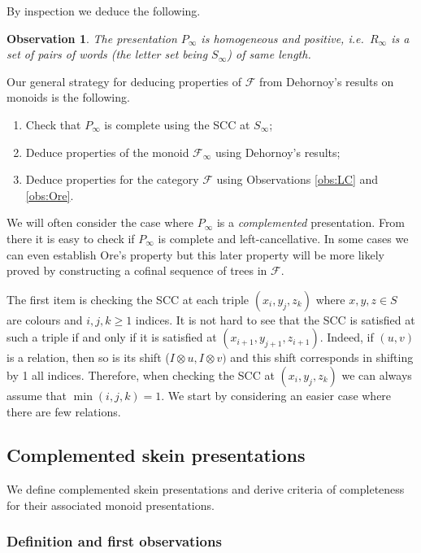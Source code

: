 \documentclass[a4paper, 12pt]{amsart}
\numberwithin{equation}{section}
\newtheorem{observation}[theorem]{Observation}
\theoremstyle{definition}
\newcommand{\cF}{\mathcal F}
\newcommand{\ot}{\otimes}
\begin{document}
By inspection we deduce the following.

\begin{observation}
The presentation $P_\infty$ is homogeneous and positive, i.e.~$R_\infty$ is a set of pairs of words (the letter set being $S_\infty$) of same length.
\end{observation}

Our general strategy for deducing properties of $\cF$ from Dehornoy's results on monoids is the following.

\begin{enumerate}
\item Check that $P_\infty$ is complete using the SCC at $S_\infty$;
\item Deduce properties of the monoid $\cF_\infty$ using Dehornoy's results;
\item Deduce properties for the category $\cF$ using Observations \ref{obs:LC} and \ref{obs:Ore}.
\end{enumerate}

We will often consider the case where $P_\infty$ is a {\it complemented} presentation. From there it is easy to check if $P_\infty$ is complete and left-cancellative. In some cases we can even establish Ore's property but this later property will be more likely proved by constructing a cofinal sequence of trees in $\cF$.

The first item is checking the SCC at each triple $(x_i,y_j,z_k)$ where $x,y,z\in S$ are colours and $i,j,k\geq 1$ indices.
It is not hard to see that the SCC is satisfied at such a triple if and only if it is satisfied at $(x_{i+1}, y_{j+1},z_{i+1})$. Indeed, if $(u,v)$ is a relation, then so is its shift ($I\ot u,I\ot v)$ and this shift corresponds in shifting by 1 all indices.
Therefore, when checking the SCC at $(x_i,y_j,z_k)$ we can always assume that $\min(i,j,k)=1$.
We start by considering an easier case where there are few relations.

\subsection{Complemented skein presentations}
We define complemented skein presentations and derive criteria of completeness for their associated monoid presentations.

\subsubsection{Definition and first observations}
\end{document}

